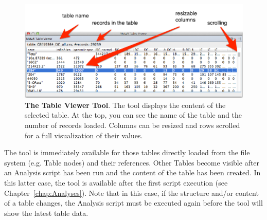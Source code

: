 \begin{figure}[h!tbp]
  \centering
  \includegraphics[width=\figWidthWide]{figures/TableViewerToolDetails.png}
\caption[The Table Viewer Tool]{\textbf{The Table Viewer Tool}. The tool displays the content of the selected table. At the top, you can see the name of the table and the number of records loaded. Columns can be resized and rows scrolled for a full visualization of their values.}
\label{fig:ToolVisualizationOptions}
\end{figure}

The tool is immediately available for those tables directly loaded from the file system (e.g. Table nodes) and their references. Other Tables become visible after an Analysis script has been run and the content of the table has been created. In this latter case, the tool is available after the first script execution (see Chapter~\ref{chap:Analyses}). Note that in this case, if the structure and/or content of a table changes, the Analysis script must be executed again before the tool will show the latest table data.


